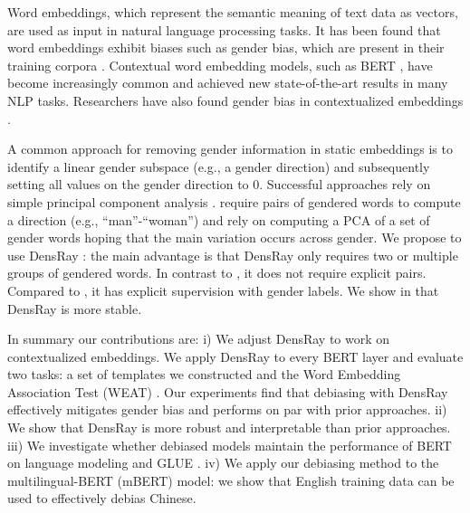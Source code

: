 Word embeddings, which represent the semantic meaning of
text data as vectors, are used as input in natural language
processing tasks. It has been found that word embeddings
exhibit biases such as gender bias, which
are present in their training
corpora \citep{bolukbasi2016man,
caliskan2017semantics,garg2018word}. Contextual word
embedding models, such as BERT \citep{devlin2018bert}, have
become increasingly common and achieved new state-of-the-art
results in many NLP tasks. Researchers have also found
gender bias in contextualized
embeddings \citep{zhao2019gender,may2019measuring}.

A common approach for removing gender information in static
embeddings is to identify a linear gender subspace (e.g., a
gender direction) and subsequently setting all values on the
gender direction to 0. Successful approaches rely on simple
principal component
analysis \cite{bolukbasi2016man,mu2018all}. \citet{bolukbasi2016man}
require pairs of gendered words to compute a direction
(e.g., ``man''-``woman'') and \citet{mu2018all} rely on
computing a PCA of a set of gender words hoping that the
main variation occurs across gender. We propose to use
DensRay \citep{dufter2019analytical}: the main advantage is
that DensRay only requires two or multiple groups of
gendered words. In contrast to \cite{bolukbasi2016man}, it
does not require explicit pairs. Compared
to \cite{mu2018all}, it has explicit supervision with gender
labels. We show in  that
DensRay is more stable.

In summary our contributions are: i) We adjust DensRay to
 work on contextualized embeddings.  We apply DensRay to
 every BERT layer and evaluate two tasks: a set of templates
 we constructed and the Word Embedding Association Test
 (WEAT) \citep{caliskan2017semantics}. Our experiments find
 that debiasing with DensRay effectively mitigates gender
 bias and performs on par with prior approaches. ii) We
 show that DensRay is more robust and interpretable than
 prior approaches.  iii) We investigate whether debiased
 models maintain the performance of BERT on language
 modeling and  GLUE  \citep{wang2018glue}. iv) We
 apply our debiasing method to the multilingual-BERT (mBERT)
 model: we show that English training data can be used to
 effectively debias Chinese.


